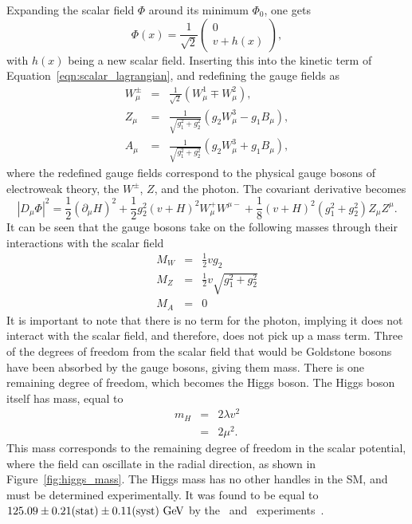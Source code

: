Expanding the scalar field $\Phi$ around its minimum $\Phi_0$, one gets
\begin{equation}
  \Phi(x) = \frac{1}{\sqrt{2}} \begin{pmatrix} 0 \\ v + h(x) \end{pmatrix},
\end{equation}
with $h(x)$ being a new scalar field.
Inserting this into the kinetic term of Equation~\ref{eqn:scalar_lagrangian},
and redefining the gauge fields as
\begin{eqnarray}
  W_{\mu}^{\pm} & = & \frac{1}{\sqrt{2}}
                      \left( W_{\mu}^{1} \mp W_{\mu}^{2} \right),
  \\
  Z_{\mu} & = & \frac{1}{\sqrt{g_1^2 + g_2^2}}
                \left( g_2 W_{\mu}^{3} - g_1 B_{\mu} \right),
  \\
  A_{\mu} & = & \frac{1}{\sqrt{g_1^2 + g_2^2}}
                \left( g_2 W_{\mu}^{3} + g_1 B_{\mu} \right),
\end{eqnarray}
where the redefined gauge fields correspond to the physical gauge bosons
of electroweak theory, the $W^{\pm}$, $Z$, and the photon.
The covariant derivative becomes
\begin{equation}
  \left| D_{\mu}\Phi \right|^2 =
  \frac{1}{2} \left( \partial_{\mu} H \right)^2 +
  \frac{1}{2} g_{2}^{2} \left(v + H\right)^2 W_{\mu}^{+}W^{\mu -} +
  \frac{1}{8} \left(v + H\right)^2 \left(g_{1}^{2} + g_{2}^{2} \right)
    Z_{\mu}Z^{\mu}.
\end{equation}
It can be seen that the gauge bosons take on the following masses through their
interactions with the scalar field
\begin{eqnarray}
  M_{W} &=& \frac{1}{2} v g_2 \\
  M_{Z} &=& \frac{1}{2} v \sqrt{g_1^2 + g_2^2} \\
  M_{A} &=& 0
\end{eqnarray}
It is important to note that there is no term for the photon, implying it does
not interact with the scalar field, and therefore, does not pick up a mass
term.
Three of the degrees of freedom from the scalar field that would be Goldstone
bosons have been absorbed by the gauge bosons, giving them mass.
There is one remaining degree of freedom, which becomes the Higgs boson.
The Higgs boson itself has mass, equal to
\begin{eqnarray}
  m_H &=& 2 \lambda v^2 \\
      &=& 2\mu^2.
\end{eqnarray}
This mass corresponds to the remaining degree of freedom in the scalar
potential, where the field can oscillate in the radial direction, as shown in
Figure~\ref{fig:higgs_mass}.
The Higgs mass has no other handles in the SM, and must be determined
experimentally.
It was found to be equal to
$125.09 \pm 0.21 \mathrm{(stat)} \pm 0.11 \mathrm{(syst)} \GeV$
by the \atlas\ and \cms\ experiments~\cite{Aad:2015zhl}.


